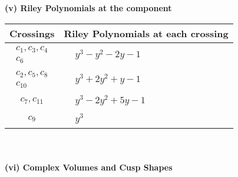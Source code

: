 \documentclass[1p]{elsarticle_modified}
\theoremstyle{definition}
\begin{document}
\newpage\renewcommand{\arraystretch}{1}
\flushleft \textbf{(v) Riley Polynomials at the component}\newline \\
\begin{tabular}{m{50pt}|m{274pt}}
Crossings & \hspace{64pt}Riley Polynomials at each crossing \\
\hline $$\begin{aligned}c_{1},c_{3},c_{4}\\c_{6}\end{aligned}$$&$\begin{aligned}
&y^3- y^2-2 y-1
\end{aligned}$\\
\hline $$\begin{aligned}c_{2},c_{5},c_{8}\\c_{10}\end{aligned}$$&$\begin{aligned}
&y^3+2 y^2+y-1
\end{aligned}$\\
\hline $$\begin{aligned}c_{7},c_{11}\end{aligned}$$&$\begin{aligned}
&y^3-2 y^2+5 y-1
\end{aligned}$\\
\hline $$\begin{aligned}c_{9}\end{aligned}$$&$\begin{aligned}
&y^3
\end{aligned}$\\
\hline
\end{tabular}\\~\\
\newpage\flushleft \textbf{(vi) Complex Volumes and Cusp Shapes}
\end{document}
